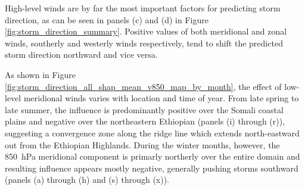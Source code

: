 High-level winds are by far the most important factors for predicting storm direction, as can be seen in panels (c) and (d) in Figure \ref{fig:storm_direction_summary}. Positive values of both meridional and zonal winds, southerly and westerly winds respectively, tend to shift the predicted storm direction northward and vice versa.

As shown in Figure \ref{fig:storm_direction_all_shap_mean_v850_map_by_month}, the effect of low-level meridional winds varies with location and time of year. From late spring to late summer, the influence is predominantly positive over the Somali coastal plains and negative over the northeastern Ethiopian (panels (i) through (r)), suggesting a convergence zone along the ridge line which extends north-eastward out from the Ethiopian Highlands. During the winter months, however, the \SI{850}{\hecto\pascal} meridional component is primarly northerly over the entire domain and resulting influence appears mostly negative, generally pushing storms southward (panels (a) through (h) and (s) through (x)).

